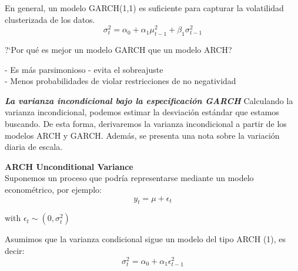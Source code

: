 	En general, un modelo GARCH(1,1)  es suficiente para capturar la volatilidad clusterizada de los datos.\\
	\begin{equation}
	\sigma_{t}^{2}=\alpha_{0}+\alpha_{1}\mu_{t-1}^{2}+\beta_{1}\sigma_{t-1}^{2}
	\end{equation}
	
	\vspace{2mm}	
	
	?`Por qu\'e es mejor un modelo GARCH que un modelo ARCH?\\
	\vspace{2mm}	
	
	- Es m\'as parsimonioso - evita el sobreajuste\\
	- Menos probabilidades de violar restricciones de no negatividad
	
	

\textit{\textbf{La varianza incondicional bajo la especificación GARCH}}
	Calculando la varianza incondicional, podemos estimar la desviaci\'on est\'andar que estamos buscando. De esta forma, derivaremos la varianza incondicional a partir de los modelos ARCH y GARCH. Adem\'as, se presenta una nota sobre la variación diaria de escala.\\
	\vspace{2mm}	
	
	\textbf{ARCH Unconditional Variance}\\
	
	Suponemos un proceso que podr\'{i}a representarse mediante un modelo econom\'etrico, por ejemplo:\\
	\begin{equation}
	y_{t}=\mu+\epsilon_{t}
	\end{equation}
	
	
	with $\epsilon_{t}\sim\left(0,\sigma_{t}^{2}\right)$
	
	Asumimos que la varianza condicional sigue un modelo del tipo ARCH (1), es decir:\\
	\begin{equation}
	\sigma_{t}^{2}=\alpha_{0}+\alpha_{1}\epsilon_{t-1}^{2}
	\end{equation}
	

